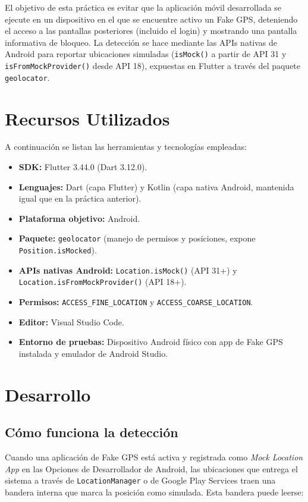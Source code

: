 \documentclass[12pt, a4paper]{article}
\begin{document}
El objetivo de esta práctica es evitar que la aplicación móvil
desarrollada se ejecute en un dispositivo en el que se encuentre activo
un Fake GPS, deteniendo el acceso a las pantallas posteriores
(incluido el login) y mostrando una pantalla informativa de bloqueo. La
detección se hace mediante las APIs nativas de Android para reportar
ubicaciones simuladas (\texttt{isMock()} a partir de API 31 y
\texttt{isFromMockProvider()} desde API 18), expuestas en Flutter a
través del paquete \texttt{geolocator}.

\section{Recursos Utilizados}
\label{sec:recursos}
A continuación se listan las herramientas y tecnologías empleadas:

\begin{itemize}
    \item \textbf{SDK:} Flutter 3.44.0 (Dart 3.12.0).
    \item \textbf{Lenguajes:} Dart (capa Flutter) y Kotlin (capa nativa Android, mantenida igual que en la práctica anterior).
    \item \textbf{Plataforma objetivo:} Android.
    \item \textbf{Paquete:} \texttt{geolocator} (manejo de permisos y posiciones, expone \texttt{Position.isMocked}).
    \item \textbf{APIs nativas Android:} \texttt{Location.isMock()} (API 31+) y \texttt{Location.isFromMockProvider()} (API 18+).
    \item \textbf{Permisos:} \texttt{ACCESS\_FINE\_LOCATION} y \texttt{ACCESS\_COARSE\_LOCATION}.
    \item \textbf{Editor:} Visual Studio Code.
    \item \textbf{Entorno de pruebas:} Dispositivo Android físico con app de Fake GPS instalada y emulador de Android Studio.
\end{itemize}

\section{Desarrollo}
\label{sec:desarrollo}

\subsection{Cómo funciona la detección}
Cuando una aplicación de Fake GPS está activa y registrada como
\textit{Mock Location App} en las Opciones de Desarrollador de Android,
las ubicaciones que entrega el sistema a través de
\texttt{LocationManager} o de Google Play Services traen una bandera
interna que marca la posición como simulada. Esta bandera puede leerse:
\end{document}
